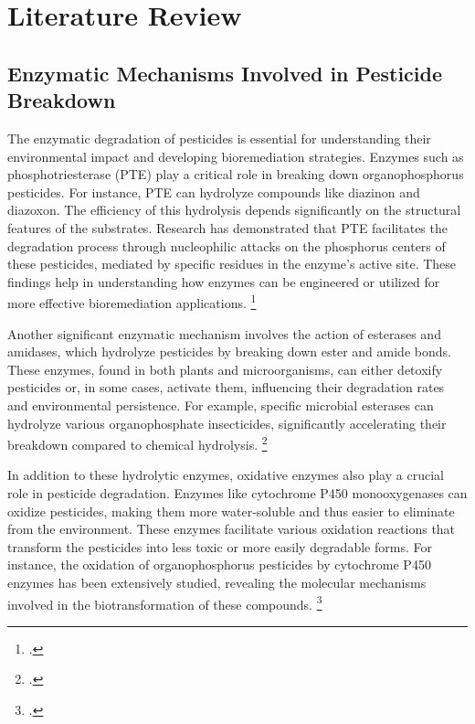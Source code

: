 \section{Literature Review}

\subsection{Enzymatic Mechanisms Involved in Pesticide Breakdown}
\label{sec:Enzymatic Mechanisms Involved in Pesticide Breakdown}

The enzymatic degradation of pesticides is essential for understanding their environmental impact and developing bioremediation strategies. Enzymes such as phosphotriesterase (PTE) play a critical role in breaking down organophosphorus pesticides. For instance, PTE can hydrolyze compounds like diazinon and diazoxon. The efficiency of this hydrolysis depends significantly on the structural features of the substrates. Research has demonstrated that PTE facilitates the degradation process through nucleophilic attacks on the phosphorus centers of these pesticides, mediated by specific residues in the enzyme's active site. These findings help in understanding how enzymes can be engineered or utilized for more effective bioremediation applications. \footcite{fuDegradationPesticidesDiazinon2021}

Another significant enzymatic mechanism involves the action of esterases and amidases, which hydrolyze pesticides by breaking down ester and amide bonds. These enzymes, found in both plants and microorganisms, can either detoxify pesticides or, in some cases, activate them, influencing their degradation rates and environmental persistence. For example, specific microbial esterases can hydrolyze various organophosphate insecticides, significantly accelerating their breakdown compared to chemical hydrolysis. \footcite{munneckeEnzymaticHydrolysisOrganophosphate1976}

In addition to these hydrolytic enzymes, oxidative enzymes also play a crucial role in pesticide degradation. Enzymes like cytochrome P450 monooxygenases can oxidize pesticides, making them more water-soluble and thus easier to eliminate from the environment. These enzymes facilitate various oxidation reactions that transform the pesticides into less toxic or more easily degradable forms. For instance, the oxidation of organophosphorus pesticides by cytochrome P450 enzymes has been extensively studied, revealing the molecular mechanisms involved in the biotransformation of these compounds. \footcite{belloTheoreticalApproachMechanism2000}

